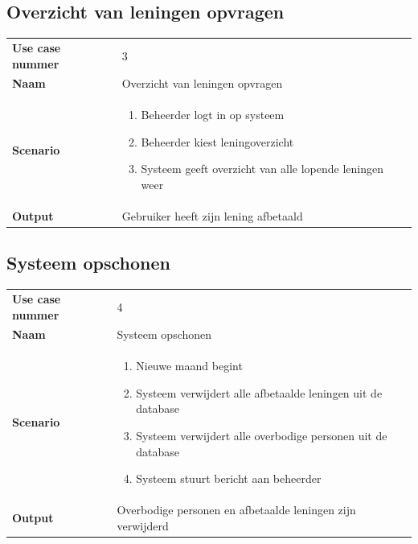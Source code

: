 \documentclass[11pt,english]{article}
\begin{document}
	\newpage
	\subsection{Overzicht van leningen opvragen}
	\begin{tabularx}{\textwidth}{ l | X }
		\textbf{Use case nummer} & 3 \\
		\textbf{Naam} & Overzicht van leningen opvragen \\
		\textbf{Scenario} &
		\begin{enumerate}
			\item Beheerder logt in op systeem
			\item Beheerder kiest leningoverzicht
			\item Systeem geeft overzicht van alle lopende leningen weer
		\end{enumerate} \\
		\textbf{Output} & Gebruiker heeft zijn lening afbetaald
	\end{tabularx}

	\newpage
	\subsection{Systeem opschonen}
	\begin{tabularx}{\textwidth}{ l | X }
		\textbf{Use case nummer} & 4 \\
		\textbf{Naam} & Systeem opschonen \\
		\textbf{Scenario} &
		\begin{enumerate}
			\item Nieuwe maand begint
			\item Systeem verwijdert alle afbetaalde leningen uit de database
			\item Systeem verwijdert alle overbodige personen uit de database
			\item Systeem stuurt bericht aan beheerder
		\end{enumerate} \\
		\textbf{Output} & Overbodige personen en afbetaalde leningen zijn verwijderd
	\end{tabularx}
\end{document}
